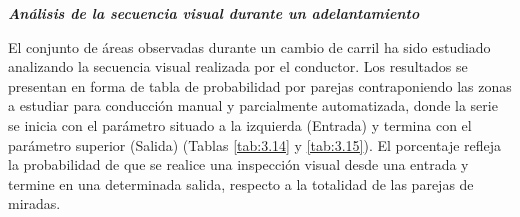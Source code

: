 \textbf{\emph{Análisis de la secuencia visual durante un adelantamiento}}\label{3232}

El conjunto de áreas observadas durante un cambio de carril ha sido estudiado analizando la secuencia visual realizada por el conductor. Los resultados se presentan en forma de tabla de probabilidad por parejas contraponiendo las zonas a estudiar para conducción manual y parcialmente automatizada, donde la serie se inicia con el parámetro situado a la izquierda (Entrada) y termina con el parámetro superior (Salida) (Tablas \ref{tab:3.14} y \ref{tab:3.15}). El porcentaje refleja la probabilidad de que se realice una inspección visual desde una entrada y termine en una determinada salida, respecto a la totalidad de las parejas de miradas.

